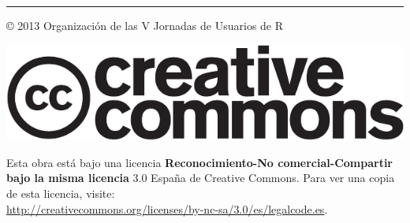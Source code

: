 




\vspace*{\fill}




\rule[.5ex]{\linewidth}{1pt} 
© 2013 Organización de las V Jornadas de Usuarios de R

\begin{center}
\includegraphics[scale=0.5]{Logos/cc-logo}
\par\end{center}

Esta obra está bajo una licencia \textbf{Reconocimiento-No comercial-Compartir
bajo la misma licencia} 3.0 España de Creative Commons. Para ver una
copia de esta licencia, visite:\\
 \url{http://creativecommons.org/licenses/by-nc-sa/3.0/es/legalcode.es}.

